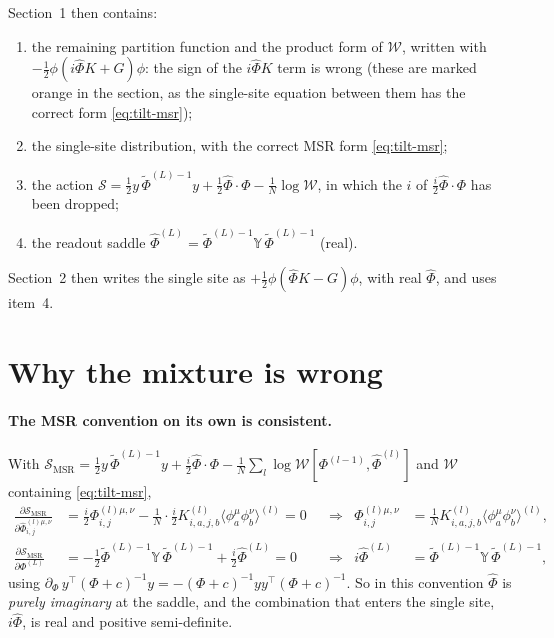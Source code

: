 \documentclass[11pt,a4paper]{article}
\newcommand{\W}{\mathcal W}
\newcommand{\Sact}{\mathcal S}
\newcommand{\Phit}{\tilde\Phi}
\begin{document}
Section~1 then contains:
\begin{enumerate}
  \item the remaining partition function and the product form of $\W$, written
    with $-\frac12\phi(i\hat\Phi K + G)\phi$: the sign of the $i\hat\Phi K$ term is
    wrong (these are marked orange in the section, as the single-site equation
    between them has the correct form \eqref{eq:tilt-msr});
  \item the single-site distribution, with the correct MSR form
    \eqref{eq:tilt-msr};
  \item the action
    $\Sact = \frac12 y\,\Phit^{(L)-1}y + \frac12\hat\Phi\cdot\Phi - \frac1N\log\W$,
    in which the $i$ of $\frac i2\hat\Phi\cdot\Phi$ has been dropped;
  \item the readout saddle $\hat\Phi^{(L)} = \Phit^{(L)-1}\mathbb Y\,\Phit^{(L)-1}$
    (real).
\end{enumerate}
Section~2 then writes the single site as
$+\frac12\phi(\hat\Phi K - G)\phi$, with real $\hat\Phi$, and uses item~4.

\section{Why the mixture is wrong}

\paragraph{The MSR convention on its own is consistent.}
With $\Sact_{\text{MSR}} = \frac12 y\,\Phit^{(L)-1}y + \frac i2\hat\Phi\cdot\Phi
- \frac1N\sum_l\log\W[\Phi^{(l-1)},\hat\Phi^{(l)}]$ and $\W$ containing
\eqref{eq:tilt-msr},
\begin{align}
  \frac{\partial\Sact_{\text{MSR}}}{\partial\hat\Phi^{(l)\mu,\nu}_{i,j}}
  &= \frac i2\Phi^{(l)\mu,\nu}_{i,j}
   - \frac1N\cdot\frac i2 K^{(l)}_{i,a,j,b}\langle\phi^\mu_a\phi^\nu_b\rangle^{(l)} = 0
  &&\Longrightarrow&
  \Phi^{(l)\mu,\nu}_{i,j} &= \frac1N K^{(l)}_{i,a,j,b}\langle\phi^\mu_a\phi^\nu_b\rangle^{(l)},
  \label{eq:forward}\\
  \frac{\partial\Sact_{\text{MSR}}}{\partial\Phi^{(L)}}
  &= -\frac12\Phit^{(L)-1}\mathbb Y\,\Phit^{(L)-1} + \frac i2\hat\Phi^{(L)} = 0
  &&\Longrightarrow&
  i\hat\Phi^{(L)} &= \Phit^{(L)-1}\mathbb Y\,\Phit^{(L)-1},
  \label{eq:readout-msr}
\end{align}
using $\partial_{\Phi}\,y^\top(\Phi+c)^{-1}y = -(\Phi+c)^{-1}yy^\top(\Phi+c)^{-1}$.
So in this convention $\hat\Phi$ is \emph{purely imaginary} at the saddle, and the
combination that enters the single site, $i\hat\Phi$, is real and positive
semi-definite.
\end{document}
